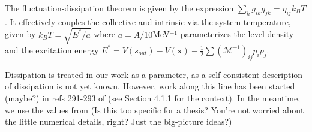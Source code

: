 The fluctuation-dissipation theorem is given by the expression $\sum_k g_{ik}g_{jk} = \eta_{ij}k_BT$. It effectively couples the collective and intrinsic via the system temperature, given by $k_BT = \sqrt{E^*/a}$ where $a=A/10$MeV$^{-1}$ parameterizes the level density and the excitation energy $E^* = V(s_{out}) - V(\mathbf{x}) - \frac{1}{2}\sum\left(\mathcal{M}^{-1}\right)_{ij}p_i p_j$.

Dissipation is treated in our work as a parameter, as a self-consistent description of dissipation is not yet known. However, work along this line has been started (maybe?) in refs 291-293 of \cite{Schmidt2018} (see Section 4.1.1 for the context). In the meantime, we use the values from \cite{Sadhukhan2016} (Is this too specific for a thesis? You're not worried about the little numerical details, right? Just the big-picture ideas?)

